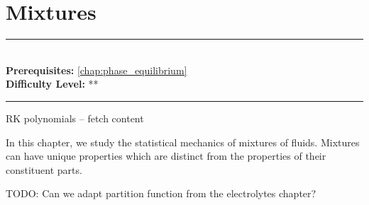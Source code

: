 \documentclass[book.tex]{subfiles}
\begin{document}
\chapter{Mixtures}

\label{chap:mixtures}
\noindent\rule{11cm}{0.4pt} \\
\textbf{Prerequisites:}  \autoref{chap:phase_equilibrium}  \\
\textbf{Difficulty Level:} ** \\
\noindent\rule{11cm}{0.4pt}
\vspace{5mm}

RK polynomials -- fetch content

In this chapter, we study the statistical mechanics of mixtures of fluids. Mixtures can have unique properties which are distinct from the properties of their constituent parts.

TODO: Can we adapt partition function from the electrolytes chapter?
\end{document}
